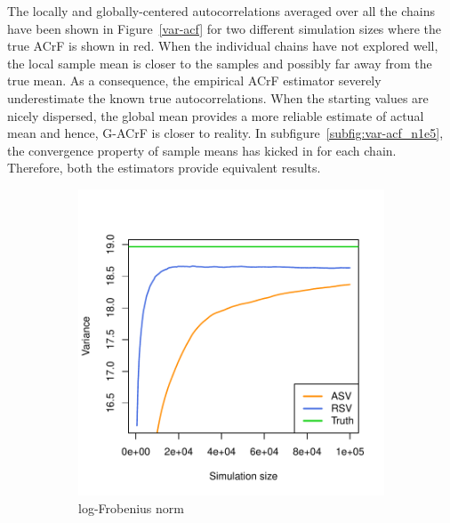 \documentclass[11pt]{article}
\theoremstyle{remark}
\begin{document}
The locally and globally-centered autocorrelations averaged over all the chains have been shown in Figure~\ref{var-acf} for two different simulation sizes where the true ACrF is shown in red. When the individual chains have not explored well, the local sample mean is closer to the samples and possibly far away from the true mean. As a consequence, the empirical ACrF estimator severely underestimate the known true autocorrelations. When the starting values are nicely dispersed, the global mean provides a more reliable estimate of actual mean and hence, G-ACrF is closer to reality. In subfigure~\ref{subfig:var-acf_n1e5}, the convergence property of sample means has kicked in for each chain. Therefore, both the estimators provide equivalent results. \\


\begin{figure}[htbp]
    \centering
    \begin{subfigure}{0.4\textwidth}
      \centering
      \includegraphics[width = \textwidth]{plots/var-frob.pdf}
      \caption{log-Frobenius norm}
      \label{subfig:var-frob}
    \end{subfigure}
    \begin{subfigure}{0.4\textwidth}
      \centering

\end{subfigure}
\end{figure}
\end{document}

